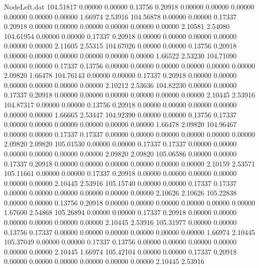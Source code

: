 \begin{filecontents}{NodeLeft.dat}
 104.51817    0.00000    0.00000     0.13756    0.20918    0.00000    0.00000    0.00000    0.00000    0.00000    0.00000    1.66974    2.53916
 104.56878    0.00000    0.00000     0.17337    0.20918    0.00000    0.00000    0.00000    0.00000    0.00000    0.00000    2.10581    2.54080
 104.61954    0.00000    0.00000     0.17337    0.20918    0.00000    0.00000    0.00000    0.00000    0.00000    0.00000    2.11605    2.55315
 104.67026    0.00000    0.00000     0.13756    0.20918    0.00000    0.00000    0.00000    0.00000    0.00000    0.00000    1.66522    2.53230
 104.71090    0.00000    0.00000     0.17337    0.13756    0.00000    0.00000    0.00000    0.00000    0.00000    0.00000    2.09820    1.66478
 104.76143    0.00000    0.00000     0.17337    0.20918    0.00000    0.00000    0.00000    0.00000    0.00000    0.00000    2.10212    2.53636
 104.82230    0.00000    0.00000     0.17337    0.20918    0.00000    0.00000    0.00000    0.00000    0.00000    0.00000    2.10445    2.53916
 104.87317    0.00000    0.00000     0.13756    0.20918    0.00000    0.00000    0.00000    0.00000    0.00000    0.00000    1.66665    2.53447
 104.92390    0.00000    0.00000     0.13756    0.17337    0.00000    0.00000    0.00000    0.00000    0.00000    0.00000    1.66478    2.09820
 104.96467    0.00000    0.00000     0.17337    0.17337    0.00000    0.00000    0.00000    0.00000    0.00000    0.00000    2.09820    2.09820
 105.01530    0.00000    0.00000     0.17337    0.17337    0.00000    0.00000    0.00000    0.00000    0.00000    0.00000    2.09820    2.09820
 105.06586    0.00000    0.00000     0.17337    0.20918    0.00000    0.00000    0.00000    0.00000    0.00000    0.00000    2.10159    2.53571
 105.11661    0.00000    0.00000     0.17337    0.20918    0.00000    0.00000    0.00000    0.00000    0.00000    0.00000    2.10445    2.53916
 105.15740    0.00000    0.00000     0.17337    0.17337    0.00000    0.00000    0.00000    0.00000    0.00000    0.00000    2.10626    2.10626
 105.22838    0.00000    0.00000     0.13756    0.20918    0.00000    0.00000    0.00000    0.00000    0.00000    0.00000    1.67600    2.54868
 105.26894    0.00000    0.00000     0.17337    0.20918    0.00000    0.00000    0.00000    0.00000    0.00000    0.00000    2.10445    2.53916
 105.31977    0.00000    0.00000     0.13756    0.17337    0.00000    0.00000    0.00000    0.00000    0.00000    0.00000    1.66974    2.10445
 105.37049    0.00000    0.00000     0.17337    0.13756    0.00000    0.00000    0.00000    0.00000    0.00000    0.00000    2.10445    1.66974
 105.42104    0.00000    0.00000     0.17337    0.20918    0.00000    0.00000    0.00000    0.00000    0.00000    0.00000    2.10445    2.53916

\end{filecontents}
